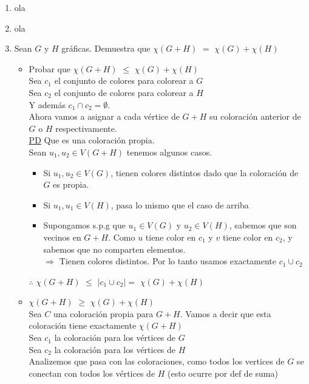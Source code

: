 \documentclass{article}
\begin{document}
\begin{enumerate}
\item ola \newline
\item ola \newline \newpage
\item Sean $G$ y $H$ gráficas. Demuestra que $\chi(G+H)$ $=$ $\chi(G)+\chi(H)$
  \begin{itemize}
  \item Probar que  $\chi(G+H)$ $\leq$ $\chi(G)+\chi(H)$ \\
    Sea $c_1$ el conjunto de colores para colorear a $G$ \\
    Sea $c_2$ el conjunto de colores para colorear a $H$ \\
    Y además $c_1 \cap c_2 = \emptyset$. \\
    Ahora vamos a asignar a cada vértice de $G+H$ su coloración anterior de $G$ o $H$ respectivamente. \\
    \underline{PD} Que es una coloración propia. \\
    Sean $u_1,u_2 \in V(G+H)$ tenemos algunos casos. \\
    \begin{itemize}
    \item Si $u_1,u_2 \in V(G)$, tienen colores distintos dado que la coloración de $G$ es propia.
    \item Si $u_1,u_1 \in V(H)$, pasa lo mismo que el caso de arriba
    \item Supongamos s.p.g que $u_1\in V(G)$ y $u_2 \in V(H)$, sabemos que son vecinos en $G+H$. Como $u$ tiene color en $c_1$ y $v$ tiene color en
      $c_2$, y sabemos que no comparten elementos.\\
      $\Longrightarrow$ Tienen colores distintos. Por lo tanto usamos exactamente $c_1 \cup c_2 $
    \end{itemize}
    $\therefore$  $\chi(G+H)$ $\leq$ $|c_1 \cup c_2| =$ $\chi(G)+\chi(H)$
  \item  $\chi(G+H)$ $\geq$ $\chi(G)+\chi(H)$ \\
    Sea $C$ una coloración propia para $G+H$. Vamos a decir que esta coloración tiene exactamente $\chi(G+H)$ \\
    Sea $c_1$ la coloración para los vértices de $G$ \\
    Sea $c_2$ la coloración para los vértices de $H$ \\
    Analizemos que pasa con las coloraciones, como todos los vertices de $G$ se conectan con todos los vértices de $H$ (esto ocurre por def de suma)

\end{itemize}
\end{enumerate}
\end{document}
